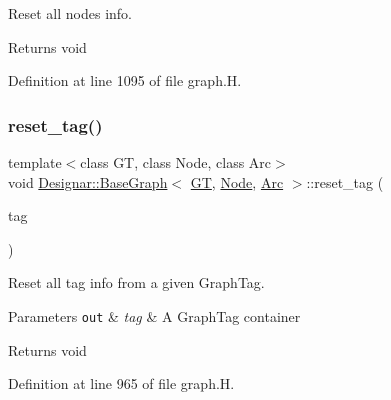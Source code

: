 Reset all nodes info. 

\begin{DoxyReturn}{Returns}
void 
\end{DoxyReturn}


Definition at line 1095 of file graph.\+H.

\mbox{\label{class_designar_1_1_base_graph_ae8845b2eb9d33f62684c8e5acc7c91b7}} 
\subsubsection{\texorpdfstring{reset\+\_\+tag()}{reset\_tag()}}
{\footnotesize\ttfamily template$<$class GT, class Node, class Arc$>$ \\
void \hyperlink{class_designar_1_1_base_graph}{Designar\+::\+Base\+Graph}$<$ \hyperlink{demo-buildgraph_8_c_a3001c40d2c31ca87ed96cd7d1334a55e}{GT}, \hyperlink{namespace_designar_a5af326c65aa2bd26b26c410f2030d09e}{Node}, \hyperlink{namespace_designar_a3f55fb5513d62ff47cbc8f72b8e95d6f}{Arc} $>$\+::reset\+\_\+tag (\begin{DoxyParamCaption}\item[{\hyperlink{namespace_designar_ac91366256ea6ea6ac5fd483d55a7499e}{Graph\+Tag}}]{tag }\end{DoxyParamCaption})\hspace{0.3cm}{\ttfamily [inline]}}



Reset all tag info from a given Graph\+Tag. 


\begin{DoxyParams}[1]{Parameters}
\mbox{\tt out}  & {\em tag} & A Graph\+Tag container \\
\hline
\end{DoxyParams}
\begin{DoxyReturn}{Returns}
void 
\end{DoxyReturn}


Definition at line 965 of file graph.\+H.

\mbox{\label{class_designar_1_1_base_graph_a0fc6cebdbc639235992617c49f8d395e}} 
